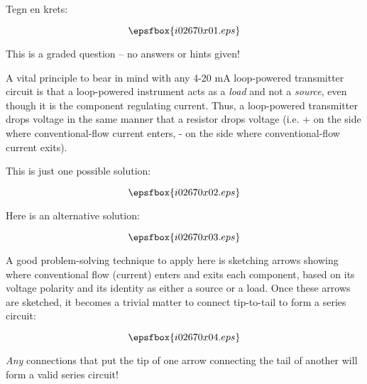 


Tegn en krets:

\vskip 50pt

$$\epsfbox{i02670x01.eps}$$

\vfil 

\eject






This is a graded question -- no answers or hints given!







A vital principle to bear in mind with any 4-20 mA loop-powered transmitter circuit is that a loop-powered instrument acts as a {\it load} and not a {\it source}, even though it is the component regulating current.  Thus, a loop-powered transmitter drops voltage in the same manner that a resistor drops voltage (i.e. + on the side where conventional-flow current enters, - on the side where conventional-flow current exits).

\vskip 10pt

This is just one possible solution:

$$\epsfbox{i02670x02.eps}$$

\vskip 10pt

Here is an alternative solution:

$$\epsfbox{i02670x03.eps}$$

\filbreak

A good problem-solving technique to apply here is sketching arrows showing where conventional flow (current) enters and exits each component, based on its voltage polarity and its identity as either a source or a load.  Once these arrows are sketched, it becomes a trivial matter to connect tip-to-tail to form a series circuit:

$$\epsfbox{i02670x04.eps}$$

{\it Any} connections that put the tip of one arrow connecting the tail of another will form a valid series circuit!





